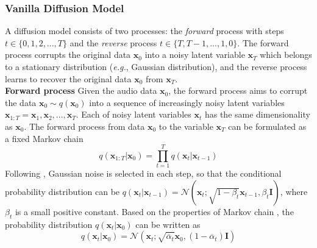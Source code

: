 \documentclass[lettersize,journal]{IEEEtran}
\begin{document}
\subsubsection{Vanilla Diffusion Model}
A diffusion model consists of two processes: the \textit{forward} process with steps $t \in \{0, 1, 2, ..., T \}$ and the \textit{reverse} process $t \in \{T, T-1, ..., 1, 0 \}$. The forward process corrupts the original data $\boldsymbol{x}_0$ into a noisy latent variable $\boldsymbol{x}_T$ which belongs to a stationary distribution (\textit{e.g.}, Gaussian distribution), and the reverse process learns to recover the original data $\boldsymbol{x}_0$ from $\boldsymbol{x}_T$.\\
\textbf{Forward process}
Given the audio data $\boldsymbol{x}_0$, the forward process aims to corrupt the data $\boldsymbol{x}_0 \sim q(\boldsymbol{x}_0)$ into a sequence of increasingly noisy latent variables $\boldsymbol{x}_{1:T}=\boldsymbol{x}_1, \boldsymbol{x}_2, ..., \boldsymbol{x}_T$. Each of noisy latent variables $\boldsymbol{x}_t$ has the {\color{black}same dimensionality as} $\boldsymbol{x}_0$. The forward process from data $\boldsymbol{x}_0$ to the
variable $\boldsymbol{x}_T$ can be formulated as a fixed Markov chain
\begin{equation}\label{forward process}
    q(\boldsymbol{x}_{1:T}|\boldsymbol{x}_0)=\prod_{t=1}^{T}q(\boldsymbol{x}_t|\boldsymbol{x}_{t-1})
\end{equation}
Following \cite{sohl2015deep}, Gaussian noise is selected in each step, so that the conditional probability distribution can be  $q(\boldsymbol{x}_t|\boldsymbol{x}_{t-1})=\mathcal{N}(\boldsymbol{x}_t;\sqrt{1-\beta_{t}}\boldsymbol{x}_{t-1}, \beta_t \boldsymbol{I})$, where $\beta_{t}$ is a small positive constant. {} 
Based on the properties of Markov chain \cite{ho2020denoising}, the probability distribution $q(\boldsymbol{x}_t|\boldsymbol{x}_0)$ can be written as
\begin{equation}\label{forward process}
    q(\boldsymbol{x}_{t}|\boldsymbol{x}_0)= \mathcal{N}(\boldsymbol{x}_t;\sqrt{\overline{\alpha}_t}\boldsymbol{x}_{0},(1-\overline{\alpha}_t) \boldsymbol{I})
\end{equation}
\end{document}
